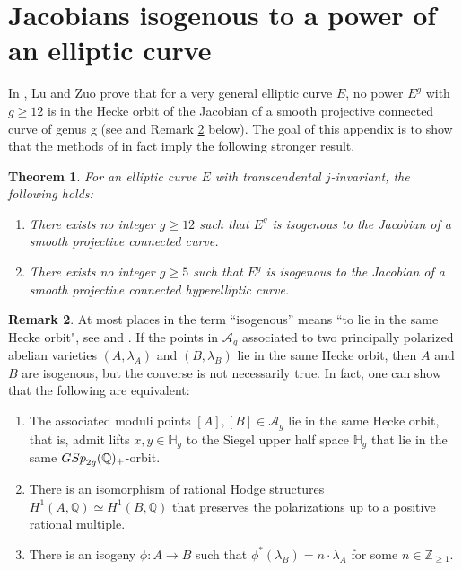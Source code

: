 \documentclass[a4paper,11pt,reqno]{amsart}
\numberwithin{equation}{section}
\newtheorem{theorem}{Theorem}[section]
\theoremstyle{plain}
\theoremstyle{definition}
\newtheorem{remark}[theorem]{Remark}
\newcommand{\Z}{\mathbb Z}
\newcommand{\Q}{\mathbb Q}
\newcommand{\bb}[1]{{\mathbb{#1}}}
\let\rm\relax
\newcommand{\rm}[1]{{\mathrm{#1}}}
\newcommand{\ca}[1]{{\mathcal{#1}}}
\renewcommand{\cong}{\simeq}
\begin{document}
\section{Jacobians isogenous to a power of an elliptic curve} \label{appendix:B} 

In \cite{luzuo-shimuracurves}, Lu and Zuo prove that for a very general elliptic curve $E$, no power $E^g$ with $g \geq 12$ is in the Hecke orbit of the Jacobian of a smooth projective connected curve of genus g (see \cite[Theorem A]{luzuo-shimuracurves} and Remark \ref{remark:be-aware} below). The goal of this appendix is to show that the methods of \cite{luzuo-shimuracurves} in fact imply the following stronger result.

\begin{theorem} \label{theorem:verygeneral-powers-elliptic-isogenies}
For an elliptic curve $E$ with transcendental $j$-invariant, the following holds: \begin{enumerate}
    \item \label{item:1:corollary:luzuo:vg}There exists no integer $g \geq 12$ such that $E^g$ is isogenous to the Jacobian of a smooth projective connected curve. \label{item:thm:powers-of-elliptic:1}
    \item \label{item:2:corollary:luzuo:vg}There exists no integer $g \geq 5$ such that $E^g$ is isogenous to the Jacobian of a smooth projective connected hyperelliptic curve. 
    \end{enumerate}
\end{theorem} 
 
 \begin{remark} \label{remark:be-aware}
At most places in \cite{luzuo-shimuracurves} the term ``isogenous'' means ``to lie in the same Hecke orbit", see \cite[paragraph below Definition 2.12]{luzuo-shimuracurves} and \cite[Lemma 2.13]{luzuo-shimuracurves}. 
If the points in $\ca A_g$ associated to two principally polarized abelian varieties $(A, \lambda_A)$ and $(B,\lambda_B)$ lie in the same Hecke orbit, then $A$ and $B$ are isogenous, but the converse is not necessarily true. In fact, one can show that the following are equivalent:
\begin{enumerate}
    \item The associated moduli points $[A],[B] \in \ca A_g$ lie in the same Hecke orbit, that is, admit lifts $x,y \in \bb H_g$ to the Siegel upper half space $\bb H_g$ that lie in the same $\rm{GSp}_{2g}(\Q)_+$-orbit.
    \item There is an isomorphism of  
    rational Hodge structures $H^1(A,\Q) \cong H^1(B,\Q)$ that preserves the polarizations up to a positive rational multiple.
    \item There is an isogeny $\phi \colon A \to B$ such that $\phi^\ast(\lambda_B) = n \cdot \lambda_A$
    for some $n \in \Z_{\geq 1}$. 
\end{enumerate} 
\end{remark}
\end{document}
